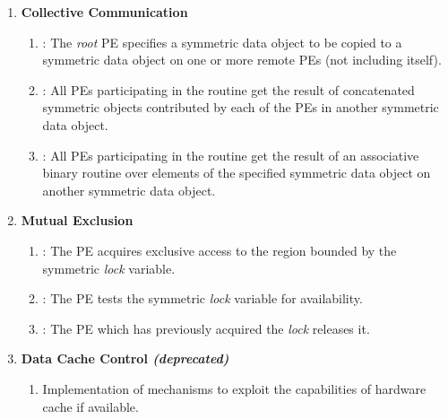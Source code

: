 \begin{enumerate}
\item \textbf{Collective Communication}
\begin{enumerate}
  \item {}: The \textit{root} \ac{PE} specifies a symmetric data
      object to be copied to a symmetric data object on one or more remote
      \acp{PE} (not including itself). 
  \item {}: All \acp{PE} participating in the routine get the result
      of concatenated symmetric objects contributed by each of the \acp{PE} in
      another symmetric data object.
  \item {}: All \acp{PE} participating in the routine get the result
      of an associative binary routine over elements of the specified symmetric
      data object on another symmetric data object. 
\end{enumerate}

\item \textbf{Mutual Exclusion}
\begin{enumerate}
  \item {}: The \ac{PE} acquires exclusive access to the region
      bounded by the symmetric \textit{lock} variable.
  \item {}: The \ac{PE} tests the symmetric \textit{lock} variable
      for availability.
  \item {}: The \ac{PE} which has previously acquired the
      \textit{lock} releases it.
\end{enumerate}

\item \textbf{Data Cache Control \textit{(deprecated)}}
\begin{enumerate}
  \item Implementation of mechanisms to exploit the capabilities of hardware cache
      if available.
\end{enumerate}
\end{enumerate}
